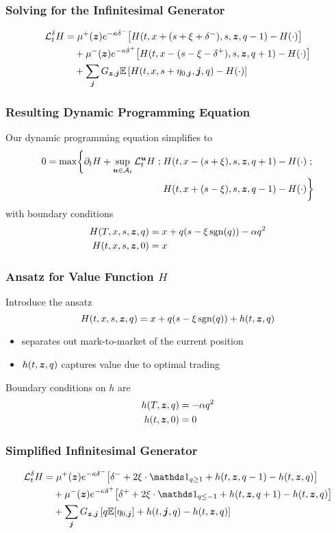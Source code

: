 \begin{frame}
\frametitle{Solving for the Infinitesimal Generator}
\[
\begin{aligned}
\mathcal{L}^{\delta}_t H & = \mu^+(\bm{z}) e^{ -\kappa \delta^{-}} \bigl[ H(t,x+(s+\xi+\delta^-),s,\bm{z},q-1) - H(\cdot) \bigr] \\
& \quad + \mu^-(\bm{z}) e^{ -\kappa \delta^{+}} \bigl[ H(t,x-(s-\xi-\delta^+),s,\bm{z},q+1) - H(\cdot) \bigr] \\
& \quad + \sum_{\bm{j}} G_{\bm{z},\bm{j}} \mathbb{E} \left[ H(t,x,s+\eta_{0,\bm{j}},\bm{j},q) - H(\cdot) \right]
\end{aligned}
\]
\end{frame}

\begin{frame}
\frametitle{Resulting Dynamic Programming Equation}
Our dynamic programming equation simplifies to
\[
\begin{aligned}
0 = \max \biggl\lbrace \partial_t H + \sup \limits_{\bm{u} \in \mathcal{A}_t} \mathcal{L}^{\bm{u}}_t H \; ; \; & H(t,x-(s+\xi), s, \bm{z}, q+1) - H(\cdot) \; ; \\
&  H(t,x+(s-\xi), s, \bm{z}, q-1) - H(\cdot) \biggr\rbrace
\end{aligned}
\]
with boundary conditions
\begin{align*}
H(T, x, s, \bm{z}, q) & = x + q(s - \xi \operatorname{\mathrm{sgn}} (q)) - \alpha q^2 \\
H(t, x, s, \bm{z}, 0) & = x
\end{align*}
\end{frame}

\begin{frame}
\frametitle{Ansatz for Value Function $H$}
Introduce the ansatz 
 \[ H(t, x, s, \bm{z}, q) = x + q(s - \xi \operatorname{\mathrm{sgn}}(q)) + h(t,\bm{z},q) \]
\begin{itemize}
\item separates out mark-to-market of the current position
\item $h(t,\bm{z},q)$ captures value due to optimal trading
\end{itemize}
Boundary conditions on $h$ are
\begin{align*}
h(T, \bm{z}, q) & = - \alpha q^2 \\
h(t, \bm{z}, 0) & = 0
\end{align*}
\end{frame}

\begin{frame}
\frametitle{Simplified Infinitesimal Generator}
\[
\begin{aligned}
\cL^{\delta}_t H & = \mu^+(\bz) e^{ -\kappa \delta^{-}} \bigl[ \delta^- + 2 \xi \cdot \indicator_{q \geq 1} + h(t,\bz,q-1) - h(t,\bz,q) \bigr] \\
& \quad + \mu^-(\bz) e^{ -\kappa \delta^{+}} \bigl[ \delta^+ + 2 \xi \cdot \indicator_{q \leq -1} + h(t,\bz,q+1) - h(t,\bz,q) \bigr] \\
& \quad + \sum_{\bj} G_{\bz,\bj} \left[q \E [\eta_{0,\bj}] +h(t,\bj,q) - h(t,\bz, q) \right]
\end{aligned}
\]
\end{frame}


